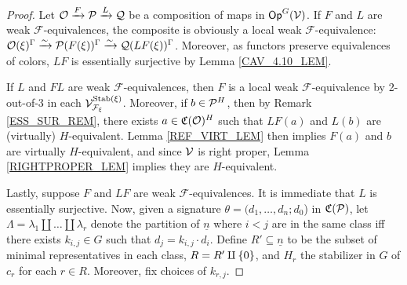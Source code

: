 \documentclass[a4paper,10pt
,draft
]{article}%
\renewcommand{\F}{\mathcal F}
\newcommand{\J}{\mathbb J}
\newcommand{\Q}{\mathcal Q}
\renewcommand{\1}{\ensuremath{\mathbb{id}}}
\begin{document}
\begin{proof}
      Let $\O \xrightarrow{F} \P \xrightarrow{L} \Q$ be a composition of maps in $\mathsf{Op}^G(\V)$.
      If $F$ and $L$ are weak $\F$-equivalences,
      the composite is obviously a local weak $\F$-equivalence:
      $\O(\ksi)^\Gamma \xrightarrow{\sim} \P(F(\ksi))^\Gamma \xrightarrow{\sim} \Q(LF(\ksi))^\Gamma$.
      Moreover, as functors preserve equivalences of colors, $L F$ is essentially surjective by Lemma \ref{CAV_4.10_LEM}. 
      
      If $L$ and $FL$ are weak $\F$-equivalences,
      then $F$ is a local weak $\F$-equivalence by 2-out-of-3 in each $\V^{\Stab(\ksi)}_{\F_\ksi}$.
      Moreover, if $b \in \P^H$, then by Remark \ref{ESS_SUR_REM}, there exists $a \in \mathfrak C(\O)^H$ such that
      $LF(a)$ and $L(b)$ are (virtually) $H$-equivalent.
      Lemma \ref{REF_VIRT_LEM} then implies $F(a)$ and $b$ are virtually $H$-equivalent, 
      and since $\V$ is right proper, Lemma \ref{RIGHTPROPER_LEM} implies they are $H$-equivalent.

      Lastly, suppose $F$ and $LF$ are weak $\F$-equivalences.
      It is immediate that $L$ is essentially surjective.
      Now, given a signature $\theta = (d_1,\ldots,d_n;d_0$) in $\C(\P)$,
      let $\Lambda = \lambda_1 \amalg \dots \amalg \lambda_r$ denote the partition of $\underline{n}$
      where $i < j$ are in the same class iff there exists $k_{i,j} \in G$ such that $d_j = k_{i,j} \cdot d_i$.
      Define $R' \subseteq \underline{n}$ to be the subset of minimal representatives in each class,
      $R = R' \amalg \set{0}$,
      and $H_r$ the stabilizer in $G$ of $c_r$ for each $r \in R$.
      Moreover, fix choices of $k_{r,j}$. 
      

\end{proof}
\end{document}
